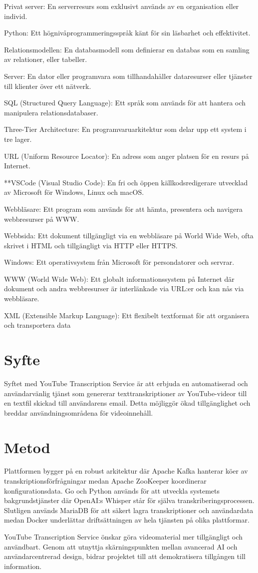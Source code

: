 Privat server: En serverresurs som exklusivt används av en organisation eller individ.

Python: Ett högnivåprogrammeringsspråk känt för sin läsbarhet och effektivitet.

Relationsmodellen: En databasmodell som definierar en databas som en samling av relationer, eller tabeller.

Server: En dator eller programvara som tillhandahåller dataresurser eller tjänster till klienter över ett nätverk.

SQL (Structured Query Language): Ett språk som används för att hantera och manipulera relationsdatabaser.

Three-Tier Architecture: En programvaruarkitektur som delar upp ett system i tre lager.

URL (Uniform Resource Locator): En adress som anger platsen för en resurs på Internet.

**VSCode (Visual Studio Code): En fri och öppen källkodsredigerare utvecklad av Microsoft för Windows, Linux och macOS.

Webbläsare: Ett program som används för att hämta, presentera och navigera webbresurser på WWW.

Webbsida: Ett dokument tillgängligt via en webbläsare på World Wide Web, ofta skrivet i HTML och tillgängligt via HTTP eller HTTPS.

Windows: Ett operativsystem från Microsoft för persondatorer och servrar.

WWW (World Wide Web): Ett globalt informationssystem på Internet där dokument och andra webbresurser är interlänkade via URL:er och kan nås via webbläsare.

XML (Extensible Markup Language): Ett flexibelt textformat för att organisera och transportera data

\section{Syfte}
Syftet med YouTube Transcription Service är att erbjuda en automatiserad och användarvänlig tjänst som genererar texttranskriptioner av YouTube-videor till en textfil skickad till användarens email. Detta möjliggör ökad tillgänglighet och breddar användningsområdena för videoinnehåll.

\section{Metod}
Plattformen bygger på en robust arkitektur där Apache Kafka hanterar köer av transkriptionsförfrågningar medan Apache ZooKeeper koordinerar konfigurationsdata. Go och Python används för att utveckla systemets bakgrundstjänster där OpenAI:s Whisper står för själva transkriberingsprocessen. Slutligen används MariaDB för att säkert lagra transkriptioner och användardata medan Docker underlättar driftsättningen av hela tjänsten på olika plattformar.

YouTube Transcription Service önskar göra videomaterial mer tillgängligt och användbart. Genom att utnyttja skärningspunkten mellan avancerad AI och användarcentrerad design, bidrar projektet till att demokratisera tillgången till information.
